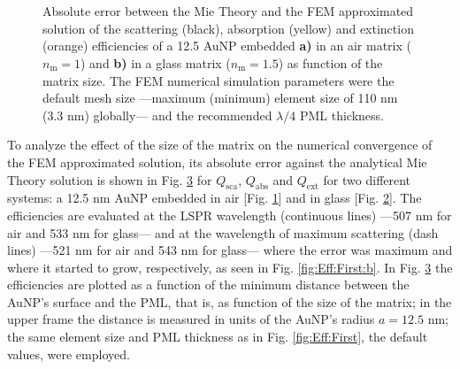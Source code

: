 %
\begin{figure}[b!]
	\centering
	\def\svgwidth{.9\textwidth}
	\small
	\vspace*{1.em}
	\hspace*{-.675\textwidth}
     \begin{subfigure}{\textwidth}\caption{}\label{fig:Eff:Matrix:a}\end{subfigure}\\[5.5em]
    \hspace*{-.675\textwidth}
     \begin{subfigure}{\textwidth}\caption{}\label{fig:Eff:Matrix:b}\end{subfigure}\\[-10.5em]
\caption[Scattering, Absorption and Extinction Efficiencies absolute error: Matrix size analysis ]{Absolute error between the Mie Theory and the FEM approximated solution of the scattering (black), absorption (yellow) and extinction (orange) efficiencies of a 12.5 AuNP embedded \textbf{a)} in an air matrix ($n_\text{m} = 1$) and \textbf{b)} in a glass matrix ($n_\text{m} = 1.5$) as function of the matrix size. The FEM numerical simulation parameters were the default mesh size ---maximum (minimum) element size of 110 nm (3.3 nm) globally--- and the recommended $\lambda/4$ PML thickness. }
\label{fig:Eff:Matrix}
\end{figure}
%
To analyze the effect of the size of the matrix on the numerical convergence of the FEM approximated solution, its absolute error against the analytical Mie Theory solution is shown in Fig. \ref{fig:Eff:Matrix} for $Q_\text{sca}$, $Q_\text{abs}$ and $Q_\text{ext}$ for two different systems: a 12.5 nm AuNP embedded in air [Fig. \ref{fig:Eff:Matrix:a}] and in glass [Fig. \ref{fig:Eff:Matrix:b}]. The efficiencies are evaluated at the LSPR wavelength (continuous lines) ---507 nm for air and 533 nm for glass--- and at the wavelength of maximum scattering (dash lines) ---521 nm for air and 543 nm for glass--- where the error was maximum and where it started to grow, respectively, as seen in Fig. \ref{fig:Eff:First:b}. In Fig. \ref{fig:Eff:Matrix} the efficiencies are plotted as a function of the minimum distance between the AuNP's surface and the PML, that is, as function of the size of the matrix; in the upper frame the distance is measured in units of the AuNP's radius $a=12.5$ nm; the same element size and PML thickness as in Fig. \ref{fig:Eff:First}, the default values, were employed.

